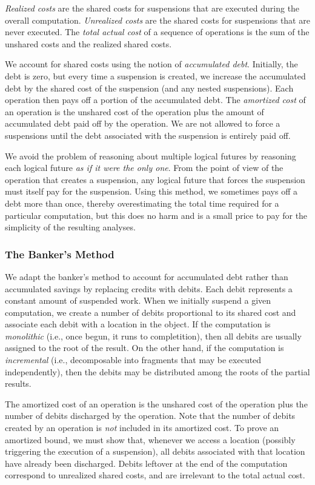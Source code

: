 \documentclass[12pt, a4paper]{article} %
\begin{document}
\textit{Realized costs} are the shared costs for suspensions that are executed during the overall computation.
\textit{Unrealized costs} are the shared costs for suspensions that are never executed.
The \textit{total actual cost} of a sequence of operations is the sum of the unshared costs and the realized shared costs.

We account for shared costs using the notion of \textit{accumulated debt}. Initially, the debt is zero, but every time a suspension is created, we increase the accumulated debt by the shared cost of the suspension (and any nested suspensions). Each operation then pays off a portion of the accumulated debt. The \textit{amortized cost} of an operation is the unshared cost of the operation plus the amount of accumulated debt paid off by the operation. We are not allowed to force a suspensions until the debt associated with the suspension is entirely paid off.

We avoid the problem of reasoning about multiple logical futures by reasoning each logical future \textit{as if it were the only one}. From the point of view of the operation that creates a suspension, any logical future that forces the suspension must itself pay for the suspension. Using this method, we sometimes pays off a debt more than once, thereby overestimating the total time required for a particular computation, but this does no harm and is a small price to pay for the simplicity of the resulting analyses.

\subsubsection{The Banker's Method}%
\label{ssub:The Banker's Method}

We adapt the banker's method to account for accumulated debt rather than accumulated savings by replacing credits with debits. Each debit represents a constant amount of suspended work. When we initially suspend a given computation, we create a number of debits proportional to its shared cost and associate each debit with a location in the object. If the computation is \textit{monolithic} (i.e., once begun, it runs to completition), then all debits are usually assigned to the root of the result. On the other hand, if the computation is \textit{incremental} (i.e., decomposable into fragments that may be executed independently), then the debits may be distributed among the roots of the partial results.

The amortized cost of an operation is the unshared cost of the operation plus the number of debits discharged by the operation. Note that the number of debits created by an operation is \textit{not} included in its amortized cost. To prove an amortized bound, we must show that, whenever we access a location (possibly triggering the execution of a suspension), all debits associated with that location have already been discharged. Debits leftover at the end of the computation correspond to unrealized shared costs, and are irrelevant to the total actual cost.
\end{document}
